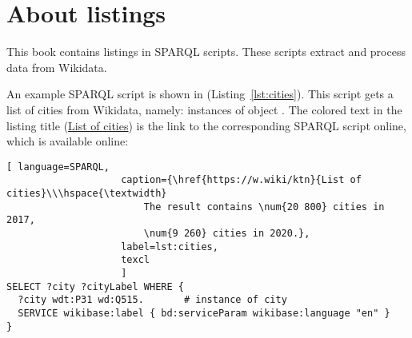 
\section{About listings}

This book contains listings in SPARQL scripts.
These scripts extract and process data from Wikidata.%

An example SPARQL script is shown in (Listing~\ref{lst:cities}). 
This script gets a list of cities from Wikidata, 
namely: instances of object .
The colored text in the listing title (\href{https://w.wiki/ktn}{List of cities}) 
is the link to the corresponding SPARQL script online, 
which is available online: 



\begin{lstlisting}[ language=SPARQL, 
                    caption={\href{https://w.wiki/ktn}{List of cities}\\\hspace{\textwidth}
                        The result contains \num{20 800} cities in 2017, 
                        \num{9 260} cities in 2020.},
                    label=lst:cities,
                    texcl 
                    ]
SELECT ?city ?cityLabel WHERE { 
  ?city wdt:P31 wd:Q515.       # instance of city 
  SERVICE wikibase:label { bd:serviceParam wikibase:language "en" }
}
\end{lstlisting}%



